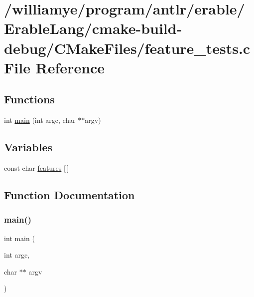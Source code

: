 \hypertarget{cmake-build-debug_2_c_make_files_2feature__tests_8c}{}\section{/williamye/program/antlr/erable/\+Erable\+Lang/cmake-\/build-\/debug/\+C\+Make\+Files/feature\+\_\+tests.c File Reference}
\label{cmake-build-debug_2_c_make_files_2feature__tests_8c}
\subsection*{Functions}
\begin{DoxyCompactItemize}
\item 
int \mbox{\hyperlink{cmake-build-debug_2_c_make_files_2feature__tests_8c_a3c04138a5bfe5d72780bb7e82a18e627}{main}} (int argc, char $\ast$$\ast$argv)
\end{DoxyCompactItemize}
\subsection*{Variables}
\begin{DoxyCompactItemize}
\item 
const char \mbox{\hyperlink{cmake-build-debug_2_c_make_files_2feature__tests_8c_a1582568e32f689337602a16bf8a5bff0}{features}} \mbox{[}$\,$\mbox{]}
\end{DoxyCompactItemize}


\subsection{Function Documentation}
\mbox{\label{cmake-build-debug_2_c_make_files_2feature__tests_8c_a3c04138a5bfe5d72780bb7e82a18e627}} 
\subsubsection{\texorpdfstring{main()}{main()}}
{\footnotesize\ttfamily int main (\begin{DoxyParamCaption}\item[{int}]{argc,  }\item[{char $\ast$$\ast$}]{argv }\end{DoxyParamCaption})}




